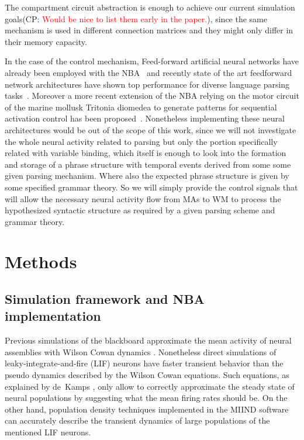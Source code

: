 \documentclass[10pt]{article}
\newcommand{\noteCP}[1]{(CP: \textcolor{red}{#1})}
\begin{document}
The compartment circuit abstraction is enough to achieve our current
simulation goals\noteCP{Would be nice to list them early in the paper.},
since the same mechanism is used in different connection matrices and
they might only differ in their memory capacity. 

In the case of the control mechanism, Feed-forward artificial neural
networks have already been employed with the
NBA~\cite{van_der_Velde_2010} and recently state of the art
feedforward network architectures have shown top performance for
diverse language parsing tasks~\cite{andor2016globally}. Moreover a more
recent extension of the NBA relying on the motor circuit of the marine
mollusk Tritonia diomedea to generate patterns for sequential
activation control has been proposed~\cite{van_Dijk_2015}. Nonetheless
implementing these neural architectures would be out of the scope of
this work, since we will not investigate the whole neural activity
related to parsing but only the portion specifically related with
variable binding, which itself is enough to look into the formation
and storage of a phrase structure with temporal events derived from
some some given parsing mechanism. Where also the expected phrase
structure is given by some specified grammar theory. So we will simply
provide the control signals that will allow the necessary neural
activity flow from MAs to WM to process the hypothesized syntactic
structure as required by a given parsing scheme and grammar theory.






\section{Methods}

{\label{488128}}

\subsection{Simulation framework and NBA implementation}\label{simulation-framework-and-architectural-decisions}

Previous simulations of the blackboard approximate the mean activity
of neural assemblies with Wilson Cowan dynamics \cite{Frank_2014}.
Nonetheless direct simulations of leaky-integrate-and-fire (LIF)
neurons \cite{omurtag2000simulation} have faster transient behavior
than the pseudo dynamics described by the Wilson Cowan equations. Such
equations, as explained by de~Kamps \cite{de_Kamps_2008}, only allow
to correctly approximate  the steady state of neural populations by
suggesting what the mean firing rates should be. On the other hand,
population density techniques \cite{de2013generic} implemented in the
MIIND software \cite{de_Kamps_2008} can
accurately describe the transient dynamics of large populations of the
mentioned LIF neurons.
\end{document}
